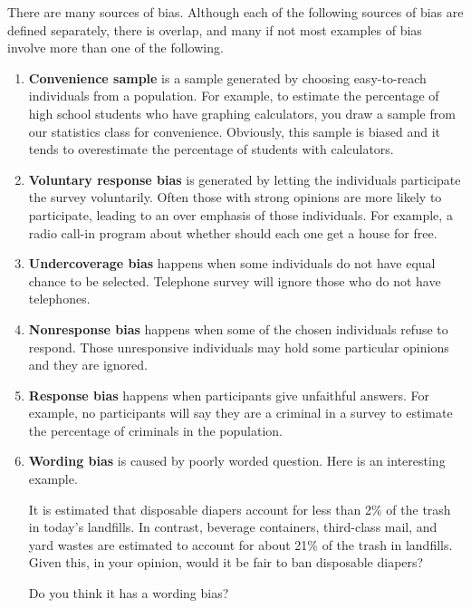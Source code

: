 \documentclass[a4paper, 12pt,twoside]{book}
\begin{document}
There are many sources of bias. Although each of the following sources of bias are defined separately, there is overlap, and many if not most examples of bias involve more than one of the following.

    \begin{enumerate}
       \item   \textbf{Convenience sample} is a sample generated by choosing easy-to-reach individuals from a population. For example, to estimate the percentage of high school students who have graphing calculators, you draw a sample from our statistics class for convenience. Obviously, this sample is biased and it tends to overestimate the percentage of students with calculators.
       
       \item \textbf{Voluntary response bias} is generated by letting the individuals participate the survey voluntarily. Often those with strong opinions are more likely to participate, leading to an over emphasis of those individuals. For example, a radio call-in program about whether should each one get a house for free.
       
       \item \textbf{Undercoverage bias} happens when some individuals do not have equal chance to be selected. Telephone survey will ignore those who do not have telephones.
       
       \item \textbf{Nonresponse bias} happens when some of the chosen individuals refuse to respond. Those unresponsive individuals may hold some particular opinions and they are ignored.
       
       \item \textbf{Response bias} happens when participants give unfaithful answers. For example, no participants will say they are a criminal in a survey to estimate the percentage of criminals in the population.
       
       \item \textbf{Wording bias} is caused by poorly worded question. Here is an interesting example.
       \begin{center}
       \begin{minipage}{0.8\textwidth}
       It is estimated that disposable diapers account for less than 2\% of the trash in today’s landfills. In contrast, beverage containers, third-class mail, and yard wastes are estimated to account for about 21\% of the trash in landfills. Given this, in your opinion, would it be fair to ban disposable diapers?
       \end{minipage}
       \end{center}
     Do you think it has a wording bias?
    \end{enumerate}
\end{document}
